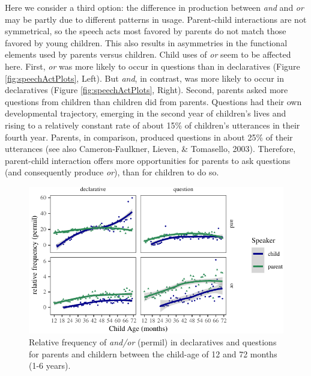 \documentclass[
  ,man,floatsintext]{apa6}
\begin{document}
Here we consider a third option: the difference in production between \emph{and} and \emph{or} may be partly due to different patterns in usage. Parent-child interactions are not symmetrical, so the speech acts most favored by parents do not match those favored by young children. This also results in asymmetries in the functional elements used by parents versus children. Child uses of \emph{or} seem to be affected here. First, \emph{or} was more likely to occur in questions than in declaratives (Figure \ref{fig:speechActPlots}, Left). But \emph{and}, in contrast, was more likely to occur in declaratives (Figure \ref{fig:speechActPlots}, Right). Second, parents asked more questions from children than children did from parents. Questions had their own developmental trajectory, emerging in the second year of children's lives and rising to a relatively constant rate of about 15\% of children's utterances in their fourth year. Parents, in comparison, produced questions in about 25\% of their utterances (see also Cameron-Faulkner, Lieven, \& Tomasello, 2003). Therefore, parent-child interaction offers more opportunities for parents to ask questions (and consequently produce \emph{or}), than for children to do so.

\begin{figure}[H]

{\centering \includegraphics{figs/ageSpeechActPlot-1} 

}

\caption{Relative frequency of \textit{and/or} (permil) in declaratives and questions for parents and childern between the child-age of 12 and 72 months (1-6 years).}\label{fig:ageSpeechActPlot}
\end{figure}
\end{document}
